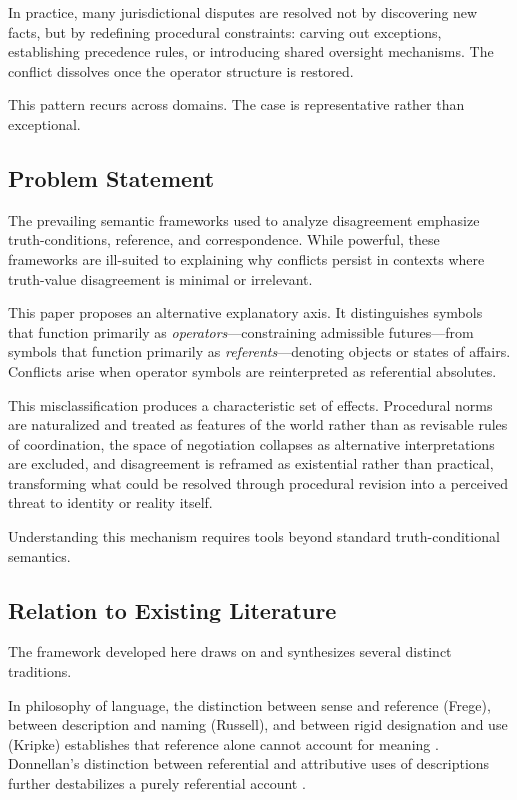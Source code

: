 \documentclass[11pt]{article}
\begin{document}
In practice, many jurisdictional disputes are resolved not by discovering new
facts, but by redefining procedural constraints: carving out exceptions,
establishing precedence rules, or introducing shared oversight mechanisms. The
conflict dissolves once the operator structure is restored.

This pattern recurs across domains. The case is representative rather than
exceptional.

\subsection{Problem Statement}

The prevailing semantic frameworks used to analyze disagreement emphasize
truth-conditions, reference, and correspondence. While powerful, these frameworks
are ill-suited to explaining why conflicts persist in contexts where truth-value
disagreement is minimal or irrelevant.

This paper proposes an alternative explanatory axis. It distinguishes symbols
that function primarily as \emph{operators}—constraining admissible futures—from
symbols that function primarily as \emph{referents}—denoting objects or states of
affairs. Conflicts arise when operator symbols are reinterpreted as referential
absolutes.

This misclassification produces a characteristic set of effects. Procedural norms
are naturalized and treated as features of the world rather than as revisable
rules of coordination, the space of negotiation collapses as alternative
interpretations are excluded, and disagreement is reframed as existential rather
than practical, transforming what could be resolved through procedural revision
into a perceived threat to identity or reality itself.

Understanding this mechanism requires tools beyond standard truth-conditional
semantics.

\subsection{Relation to Existing Literature}

The framework developed here draws on and synthesizes several distinct traditions.

In philosophy of language, the distinction between sense and reference (Frege),
between description and naming (Russell), and between rigid designation and use
(Kripke) establishes that reference alone cannot account for meaning
\cite{frege1892,russell1905,kripke1980}. Donnellan’s distinction between
referential and attributive uses of descriptions further destabilizes a purely
referential account \cite{donnellan1966}.
\end{document}
